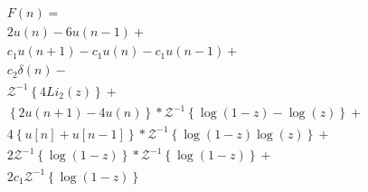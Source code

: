 \documentclass[a4paper,10pt]{article}
\begin{document}
$$
\begin{array}{lcl} 
 F(n) = \\
 2 u(n) -6 u(n-1) +\\
 c_1 u(n + 1) -c_1 u(n) - c_1 u(n-1) + \\
 c_2 \delta(n)- \\
 \mathcal{Z}^{-1}\left\{4 Li_2(z)\right\}+\\
 \left\{2 u(n+1) - 4 u(n)\right\} *
 \mathcal{Z}^{-1}\left\{\displaystyle \log(1-z) - \log(z)\right\} +\\
 4\displaystyle\left\{u[n] + u[n-1]\right\}*
 \mathcal{Z}^{-1}\left\{ \log(1-z)\log(z) \right\}+\\
 2\mathcal{Z}^{-1}\left\{ \log(1-z)\right\} * \mathcal{Z}^{-1}\left\{  \log(1-z)\right\}+ \\
 2 c_1 \mathcal{Z}^{-1}\left\{  \log(1-z)\right\} 
\end{array} 
$$
\end{document}
